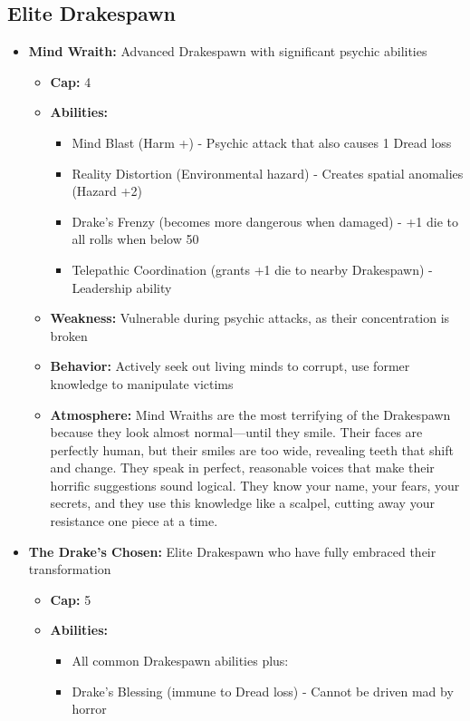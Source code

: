 \documentclass[11pt]{article}
\begin{document}
\subsection{Elite Drakespawn}
\begin{itemize}
\item \textbf{Mind Wraith:} Advanced Drakespawn with significant psychic abilities
  \begin{itemize}
  \item \textbf{Cap:} 4
  \item \textbf{Abilities:}
    \begin{itemize}
    \item Mind Blast (Harm +) - Psychic attack that also causes 1 Dread loss
    \item Reality Distortion (Environmental hazard) - Creates spatial anomalies (Hazard +2)
    \item Drake's Frenzy (becomes more dangerous when damaged) - +1 die to all rolls when below 50%
    \item Telepathic Coordination (grants +1 die to nearby Drakespawn) - Leadership ability
    \end{itemize}
  \item \textbf{Weakness:} Vulnerable during psychic attacks, as their concentration is broken
  \item \textbf{Behavior:} Actively seek out living minds to corrupt, use former knowledge to manipulate victims
  \item \textbf{Atmosphere:} Mind Wraiths are the most terrifying of the Drakespawn because they look almost normal—until they smile. Their faces are perfectly human, but their smiles are too wide, revealing teeth that shift and change. They speak in perfect, reasonable voices that make their horrific suggestions sound logical. They know your name, your fears, your secrets, and they use this knowledge like a scalpel, cutting away your resistance one piece at a time.
  \end{itemize}
\item \textbf{The Drake's Chosen:} Elite Drakespawn who have fully embraced their transformation
  \begin{itemize}
  \item \textbf{Cap:} 5
  \item \textbf{Abilities:}
    \begin{itemize}
    \item All common Drakespawn abilities plus:
    \item Drake's Blessing (immune to Dread loss) - Cannot be driven mad by horror

\end{itemize}
\end{itemize}
\end{itemize}
\end{document}
